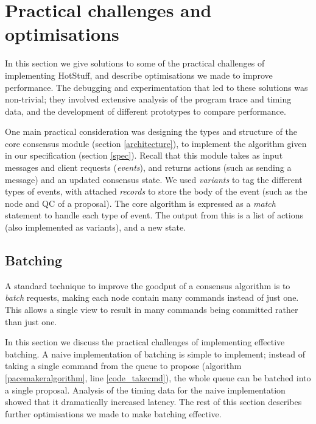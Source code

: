 \section{Practical challenges and optimisations} \label{performance}

In this section we give solutions to some of the practical challenges of implementing HotStuff, and describe optimisations we made to improve performance. The debugging and experimentation that led to these solutions was non-trivial; they involved extensive analysis of the program trace and timing data, and the development of different prototypes to compare performance.

One main practical consideration was designing the types and structure of the core consensus module (section \ref{architecture}), to implement the algorithm given in our specification (section \ref{spec}). Recall that this module takes as input messages and client requests (\textit{events}), and returns actions (such as sending a message) and an updated consensus state. We used \textit{variants} to tag the different types of events, with attached \textit{records} to store the body of the event (such as the node and QC of a proposal). The core algorithm is expressed as a \textit{match} statement to handle each type of event. The output from this is a list of actions (also implemented as variants), and a new state.

\subsection{Batching} \label{batching}

A standard technique to improve the goodput of a consensus algorithm is to \textit{batch} requests, making each node contain many commands instead of just one. This allows a single view to result in many commands being committed rather than just one.

In this section we discuss the practical challenges of implementing effective batching. A naive implementation of batching is simple to implement; instead of taking a single command from the queue to propose (algorithm \ref{pacemakeralgorithm}, line \ref{code_takecmd}), the whole queue can be batched into a single proposal. Analysis of the timing data for the naive implementation showed that it dramatically increased latency. The rest of this section describes further optimisations we made to make batching effective.

